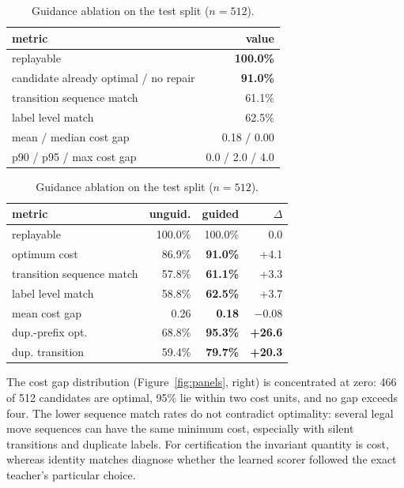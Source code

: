 \documentclass[manuscript,screen,nonacm]{acmart}
\begin{document}
\begin{table}
\centering
\begin{minipage}[t]{0.32\textwidth}
\vspace{0pt}
\centering
\caption{Results on held out data ($n = 512$).}
\label{tab:headline}
\scriptsize
\setlength{\tabcolsep}{2pt}
\begin{tabular}{@{}lr@{}}
\toprule
metric & value \\
\midrule
replayable & \textbf{100.0\%} \\
candidate already optimal / no repair & \textbf{91.0\%} \\
transition sequence match & 61.1\% \\
label level match & 62.5\% \\
mean / median cost gap & 0.18 / 0.00 \\
p90 / p95 / max cost gap & 0.0 / 2.0 / 4.0 \\
\bottomrule
\end{tabular}
\end{minipage}\hfill
\begin{minipage}[t]{0.64\textwidth}
\vspace{0pt}
\centering
\caption{Guidance ablation on the test split ($n = 512$).}
\label{tab:ablation}
\scriptsize
\setlength{\tabcolsep}{2pt}
\begin{tabular}{@{}lrrr@{}}
\toprule
metric & unguid. & guided & $\Delta$ \\
\midrule
replayable & 100.0\% & 100.0\% & 0.0 \\
optimum cost & 86.9\% & \textbf{91.0\%} & +4.1 \\
transition sequence match & 57.8\% & \textbf{61.1\%} & +3.3 \\
label level match & 58.8\% & \textbf{62.5\%} & +3.7 \\
mean cost gap & 0.26 & \textbf{0.18} & $-$0.08 \\
dup.-prefix opt. & 68.8\% & \textbf{95.3\%} & \textbf{+26.6} \\
dup. transition & 59.4\% & \textbf{79.7\%} & \textbf{+20.3} \\
\bottomrule
\end{tabular}
\end{minipage}
\end{table}

The cost gap distribution (Figure~\ref{fig:panels}, right) is concentrated at zero: 466 of 512 candidates are optimal, 95\% lie within two cost units, and no gap exceeds four. The lower sequence match rates do not contradict optimality: several legal move sequences can have the same minimum cost, especially with silent transitions and duplicate labels. For certification the invariant quantity is cost, whereas identity matches diagnose whether the learned scorer followed the exact teacher's particular choice.
\end{document}
